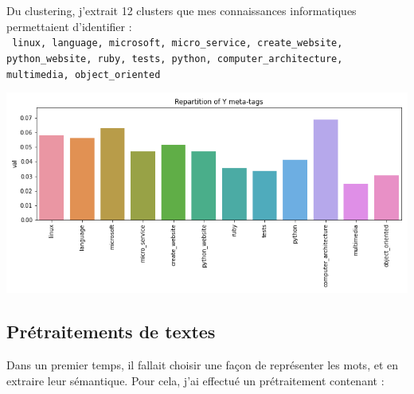 \documentclass[a4paper,11pt]{article}
\begin{document}
Du clustering, j'extrait 12 clusters que mes connaissances informatiques permettaient d'identifier : \\
{\small \centering \texttt{ linux, language, microsoft, micro\_service, create\_website, python\_website, ruby, tests, python, computer\_architecture, multimedia, object\_oriented }}
\begin{center}
   \includegraphics[width=\linewidth]{figures/Y_distribution.png}
\end{center}




\subsection{Prétraitements de textes}

Dans un premier temps, il fallait choisir une façon de représenter les mots, et en extraire leur sémantique. Pour cela, j'ai effectué un prétraitement contenant :\\
\end{document}
